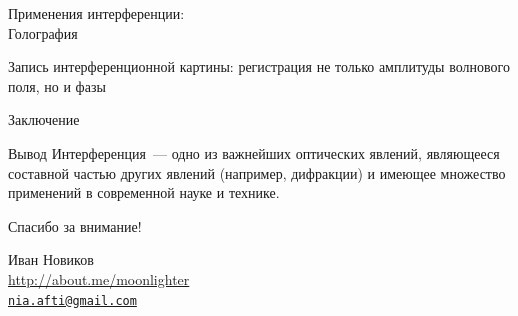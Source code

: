 \documentclass[usenames,dvipsnames,pdftex,unicode,hidelinks]{beamer}
\begin{document}
\begin{frame}{Применения интерференции:\\ Голография}
\begin{center}
      \begin{block}{}
        Запись интерференционной картины: регистрация не только амплитуды волнового поля, но и фазы
      \end{block}
    \end{center}
  \end{frame}

  \begin{frame}{Заключение}
    \begin{block}{Вывод}
      Интерференция~--- одно из важнейших оптических явлений, являющееся составной частью других
      явлений (например, дифракции) и имеющее множество применений в современной науке и технике.
    \end{block}
  \end{frame}

  \begin{frame}[plain]
    \begin{center}
      { \Huge Спасибо за внимание! }

      \vspace{1cm}

      Иван Новиков\\
      \url{http://about.me/moonlighter}\\
      \href{mailto:nia.afti@gmail.com}{\nolinkurl{nia.afti@gmail.com} }
      
    \end{center}
  \end{frame}
\end{document}
